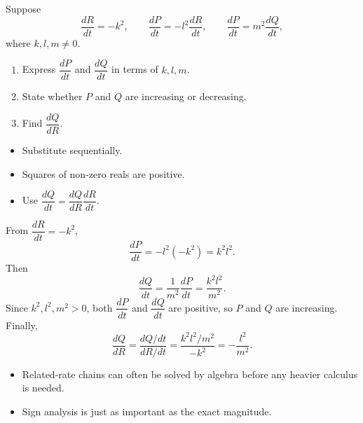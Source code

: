 \begin{problem}
Suppose
\[
\frac{dR}{dt}=-k^2,\qquad \frac{dP}{dt}=-l^2\frac{dR}{dt},\qquad \frac{dP}{dt}=m^2\frac{dQ}{dt},
\]
where $k,l,m\neq0$.
\begin{enumerate}
    \item[\textbf{i}] Express $\dfrac{dP}{dt}$ and $\dfrac{dQ}{dt}$ in terms of $k,l,m$.
    \item[\textbf{ii}] State whether $P$ and $Q$ are increasing or decreasing.
    \item[\textbf{iii}] Find $\dfrac{dQ}{dR}$.
\end{enumerate}
\end{problem}

\begin{hint}
\begin{itemize}[leftmargin=*]
    \item Substitute sequentially.
    \item Squares of non-zero reals are positive.
    \item Use $\dfrac{dQ}{dt}=\dfrac{dQ}{dR}\dfrac{dR}{dt}$.
\end{itemize}
\end{hint}

\begin{solution}
From $\dfrac{dR}{dt}=-k^2$,
\[
\frac{dP}{dt}=-l^2(-k^2)=k^2l^2.
\]
Then
\[
\frac{dQ}{dt}=\frac{1}{m^2}\frac{dP}{dt}=\boxed{\frac{k^2l^2}{m^2}}.
\]
Since $k^2,l^2,m^2>0$, both $\dfrac{dP}{dt}$ and $\dfrac{dQ}{dt}$ are positive, so $P$ and $Q$ are increasing.
Finally,
\[
\frac{dQ}{dR}=\frac{dQ/dt}{dR/dt}
=\frac{k^2l^2/m^2}{-k^2}
=\boxed{-\frac{l^2}{m^2}}.
\]
\end{solution}

\begin{takeaways}
\begin{itemize}[leftmargin=*]
    \item Related-rate chains can often be solved by algebra before any heavier calculus is needed.
    \item Sign analysis is just as important as the exact magnitude.
\end{itemize}
\end{takeaways}
